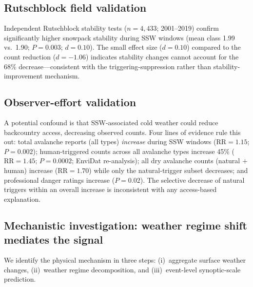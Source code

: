 \documentclass[11pt,letterpaper]{article}
\begin{document}
\subsection*{Rutschblock field validation}

Independent Rutschblock stability tests ($n = 4{,}433$; 2001--2019) confirm significantly higher snowpack stability during SSW windows (mean class 1.99 vs.\ 1.90; $P = 0.003$; $d = 0.10$). The small effect size ($d = 0.10$) compared to the count reduction ($d = -1.06$) indicates stability changes cannot account for the 68\% decrease---consistent with the triggering-suppression rather than stability-improvement mechanism.

\subsection*{Observer-effort validation}

A potential confound is that SSW-associated cold weather could reduce backcountry access, decreasing observed counts. Four lines of evidence rule this out: total avalanche reports (all types) \emph{increase} during SSW windows ($\mathrm{RR} = 1.15$; $P = 0.002$); human-triggered counts across all avalanche types increase 45\% ($\mathrm{RR} = 1.45$; $P = 0.0002$; EnviDat re-analysis); all dry avalanche counts (natural $+$ human) increase ($\mathrm{RR} = 1.70$) while only the natural-trigger subset decreases; and professional danger ratings increase ($P = 0.02$). The selective decrease of natural triggers within an overall increase is inconsistent with any access-based explanation.

\subsection*{Mechanistic investigation: weather regime shift mediates the signal}

We identify the physical mechanism in three steps: (i)~aggregate surface weather changes, (ii)~weather regime decomposition, and (iii)~event-level synoptic-scale prediction.
\end{document}
